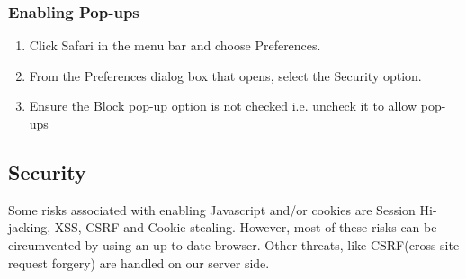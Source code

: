 \documentclass[hidelinks,english]{article}
\begin{document}
         \subsubsection{Enabling Pop-ups}
            \begin{enumerate}
                \item Click Safari in the menu bar and choose Preferences.
                \item From the Preferences dialog box that opens, select the Security option.
                \item Ensure the Block pop-up option is not checked i.e. uncheck it to allow pop-ups
            \end{enumerate}
            \begin{center}
            \end{center}
        \subsection{Security}
            Some risks associated with enabling Javascript and/or cookies are Session Hi-jacking, XSS, CSRF and Cookie stealing. However, most of these risks can be circumvented by using an up-to-date browser. Other threats, like CSRF(cross site request forgery) are handled on our server side.
\end{document}
